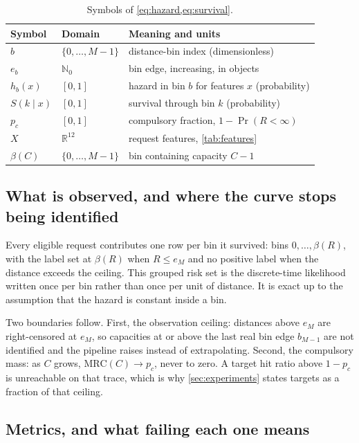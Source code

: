 \begin{table}[t]
\centering
\footnotesize
\caption{Symbols of \cref{eq:hazard,eq:survival}.}
\label{tab:sym-hazard}
\begin{tabular}{@{}l l l@{}}
\toprule
Symbol & Domain & Meaning and units \\
\midrule
$b$ & $\{0,\dots,M-1\}$ & distance-bin index (dimensionless) \\
$e_b$ & $\mathbb{N}_0$ & bin edge, increasing, in objects \\
$h_b(x)$ & $[0,1]$ & hazard in bin $b$ for features $x$ (probability) \\
$S(k\mid x)$ & $[0,1]$ & survival through bin $k$ (probability) \\
$p_c$ & $[0,1]$ & compulsory fraction, $1-\Pr(R<\infty)$ \\
$X$ & $\mathbb{R}^{12}$ & request features, \cref{tab:features} \\
$\beta(C)$ & $\{0,\dots,M-1\}$ & bin containing capacity $C-1$ \\
\bottomrule
\end{tabular}
\end{table}

\subsection{What is observed, and where the curve stops being identified}
\label{sec:identification}

Every eligible request contributes one row per bin it survived: bins
$0,\dots,\beta(R)$, with the label set at $\beta(R)$ when $R\le e_M$ and no positive
label when the distance exceeds the ceiling. This grouped risk set is the
discrete-time likelihood written once per bin rather than once per unit of distance.
It is exact up to the assumption that the hazard is constant inside a bin.

Two boundaries follow. First, the observation ceiling: distances above $e_M$ are
right-censored at $e_M$, so capacities at or above the last real bin edge $b_{M-1}$
are not identified and the pipeline raises instead of extrapolating. Second, the
compulsory mass: as $C$ grows, $\mathrm{MRC}(C)\to p_c$, never to zero. A target hit
ratio above $1-p_c$ is unreachable on that trace, which is why
\cref{sec:experiments} states targets as a fraction of that ceiling.

\subsection{Metrics, and what failing each one means}
\label{sec:metrics}

